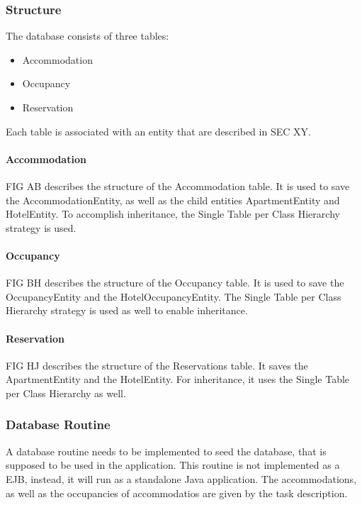 \subsubsection{Structure}
The database consists of three tables:
\begin{itemize}
\item Accommodation
\item Occupancy
\item Reservation
\end{itemize}
Each table is associated with an entity that are described in SEC XY.

\paragraph{Accommodation}
FIG AB describes the structure of the Accommodation table. It is used to save the AccommodationEntity, as well as the child entities ApartmentEntity and HotelEntity.
To accomplish inheritance, the Single Table per Class Hierarchy strategy is used.

\paragraph{Occupancy}
FIG BH describes the structure of the Occupancy table. It is used to save the OccupancyEntity and the HotelOccupancyEntity.
The Single Table per Class Hierarchy strategy is used as well to enable inheritance.

\paragraph{Reservation}
FIG HJ describes the structure of the Reservations table. It saves the ApartmentEntity and the HotelEntity.
For inheritance, it uses the Single Table per Class Hierarchy as well.


\subsubsection{Database Routine}
A database routine needs to be implemented to seed the database, that is supposed to be used in the application.
This routine is not implemented as a EJB, instead, it will run as a standalone Java application.
The accommodations, as well as the occupancies of accommodatios are given by the task description.

